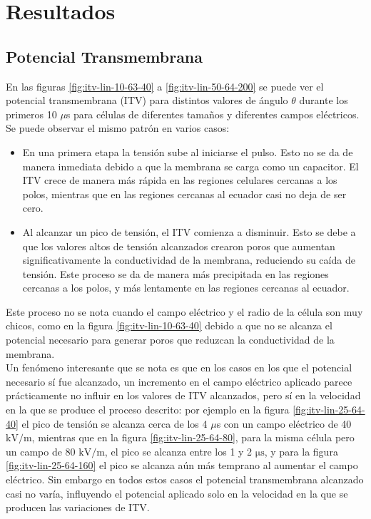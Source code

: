 \documentclass[11pt,a4paper,twoside]{tesis}
\newcommand{\kvm}{$\si{\kilo\volt\per\metre}$}
\newcommand{\usec}{$\si{\micro\second}$}
\begin{document}
\chapter{Resultados}

\section{Potencial Transmembrana}

En las figuras \ref{fig:itv-lin-10-63-40} a \ref{fig:itv-lin-50-64-200} se puede ver el potencial transmembrana (ITV) para distintos valores de ángulo $\theta$ durante los primeros 10 $\mu$s para células de diferentes tamaños y diferentes campos eléctricos. Se puede observar el mismo patrón en varios casos:
\begin{itemize}
	\item En una primera etapa la tensión sube al iniciarse el pulso. Esto no se da de manera inmediata debido a que la membrana se carga como un capacitor. El ITV crece de manera más rápida en las regiones celulares cercanas a los polos, mientras que en las regiones cercanas al ecuador casi no deja de ser cero.
	\item Al alcanzar un pico de tensión, el ITV comienza a disminuir. Esto se debe a que los valores altos de tensión alcanzados crearon poros que aumentan significativamente la conductividad de la membrana, reduciendo su caída de tensión. Este proceso se da de manera más precipitada en las regiones cercanas a los polos, y más lentamente en las regiones cercanas al ecuador. 
\end{itemize}

Este proceso no se nota cuando el campo eléctrico y el radio de la célula son muy chicos, como en la figura \ref{fig:itv-lin-10-63-40} debido a que no se alcanza el potencial necesario para generar poros que reduzcan la conductividad de la membrana.\\

Un fenómeno interesante que se nota es que en los casos en los que el potencial necesario sí fue alcanzado, un incremento en el campo eléctrico aplicado parece prácticamente no influir en los valores de ITV alcanzados, pero sí en la velocidad en la que se produce el proceso descrito: por ejemplo en la figura \ref{fig:itv-lin-25-64-40} el pico de tensión se alcanza cerca de los 4 $\mu$s con un campo eléctrico de 40 \kvm, mientras que en la figura \ref{fig:itv-lin-25-64-80}, para la misma célula pero un campo de 80 \kvm, el pico se alcanza entre los 1 y 2 \usec, y para la figura \ref{fig:itv-lin-25-64-160} el pico se alcanza aún más temprano al aumentar el campo eléctrico. Sin embargo en todos estos casos el potencial transmembrana alcanzado casi no varía, influyendo el potencial aplicado solo en la velocidad en la que se producen las variaciones de ITV.\\
\end{document}
